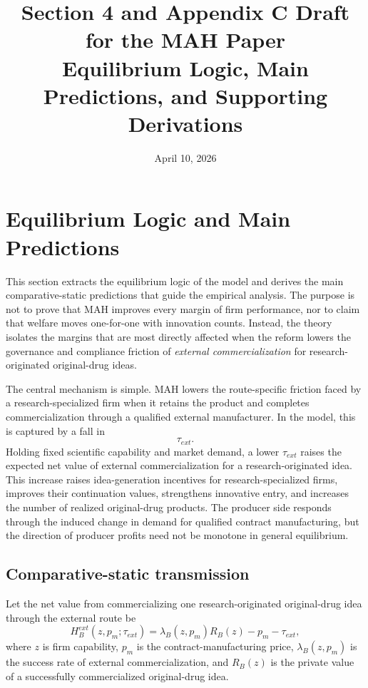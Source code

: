 \documentclass[12pt]{article}
\title{Section 4 and Appendix C Draft for the MAH Paper\\
Equilibrium Logic, Main Predictions, and Supporting Derivations}
\author{}
\date{April 10, 2026}
\begin{document}
\maketitle

\section{Equilibrium Logic and Main Predictions}

This section extracts the equilibrium logic of the model and derives the main comparative-static predictions that guide the empirical analysis. The purpose is not to prove that MAH improves every margin of firm performance, nor to claim that welfare moves one-for-one with innovation counts. Instead, the theory isolates the margins that are most directly affected when the reform lowers the governance and compliance friction of \emph{external commercialization} for research-originated original-drug ideas.

The central mechanism is simple. MAH lowers the route-specific friction faced by a research-specialized firm when it retains the product and completes commercialization through a qualified external manufacturer. In the model, this is captured by a fall in
\[
\tau_{ext}.
\]
Holding fixed scientific capability and market demand, a lower \(\tau_{ext}\) raises the expected net value of external commercialization for a research-originated idea. This increase raises idea-generation incentives for research-specialized firms, improves their continuation values, strengthens innovative entry, and increases the number of realized original-drug products. The producer side responds through the induced change in demand for qualified contract manufacturing, but the direction of producer profits need not be monotone in general equilibrium.

\subsection{Comparative-static transmission}

Let the net value from commercializing one research-originated original-drug idea through the external route be
\[
H_B^{ext}(z,p_m;\tau_{ext})
=
\lambda_B(z,p_m)R_B(z)-p_m-\tau_{ext},
\]
where \(z\) is firm capability, \(p_m\) is the contract-manufacturing price, \(\lambda_B(z,p_m)\) is the success rate of external commercialization, and \(R_B(z)\) is the private value of a successfully commercialized original-drug idea.
\end{document}
